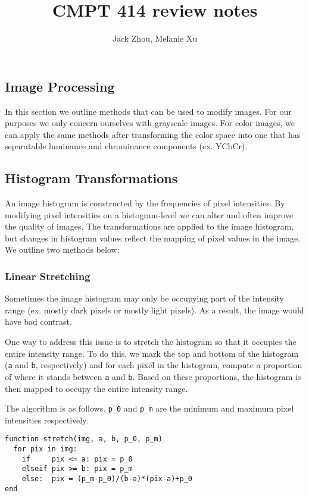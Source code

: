 \documentclass{article}
\title{CMPT 414 review notes}
\author{Jack Zhou, Melanie Xu}
\date{}
\begin{document}

\begin{multicols}{3}

\section{Image Processing}

In this section we outline methods that can be used to modify images. For our purposes we only concern ourselves with grayscale images. For color images, we can apply the same methods after transforming the color space into one that has separatable luminance and chrominance components (ex. YCbCr).

\subsection{Histogram Transformations}

An image histogram is constructed by the frequencies of pixel intensities. By modifying pixel intensities on a histogram-level we can alter and often improve the quality of images. The transformations are applied to the image histogram, but changes in histogram values reflect the mapping of pixel values in the image. We outline two methods below:

\subsubsection{Linear Stretching}

Sometimes the image histogram may only be occupying part of the intensity range (ex. mostly dark pixels or mostly light pixels). As a result, the image would have bad contrast.

One way to address this issue is to stretch the histogram so that it occupies the entire intensity range. To do this, we mark the top and bottom of the histogram (\texttt{a} and \texttt{b}, respectively) and for each pixel in the histogram, compute a proportion of where it stands between \texttt{a} and \texttt{b}. Based on these proportions, the histogram is then mapped to occupy the entire intensity range.

The algorithm is as follows. \texttt{p\_0} and \texttt{p\_m} are the minimum and maximum pixel intensities respectively.

\begin{verbatim}
function stretch(img, a, b, p_0, p_m)
  for pix in img:
    if     pix <= a: pix = p_0
    elseif pix >= b: pix = p_m
    else:  pix = (p_m-p_0)/(b-a)*(pix-a)+p_0
end
\end{verbatim}


\end{multicols}
\end{document}
